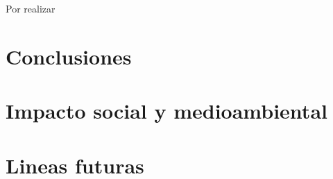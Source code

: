 \documentclass[../main.tex]{subfiles}
\begin{document}
Por realizar
\section{Conclusiones}
\section{Impacto social y medioambiental}
\section{Lineas futuras}
\end{document}
